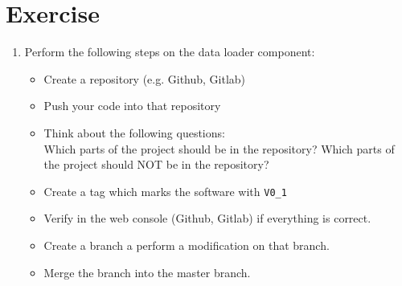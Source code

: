 %
\newslide
\section{Exercise}
\begin{enumerate}
\item Perform the following steps on the data loader component:
\begin{itemize}
\item Create a repository (e.g. Github, Gitlab)
\item Push your code into that repository
\item Think about the following questions:\\
Which parts of the project should be in the repository?
Which parts of the project should NOT be in the repository?
\item Create a tag which marks the software with \verb|V0_1|
\item Verify in the web console (Github, Gitlab) if
everything is correct.
\item Create a branch a perform a modification on that branch.
\item Merge the branch into the master branch.
\end{itemize}

\end{enumerate}
\newslide
